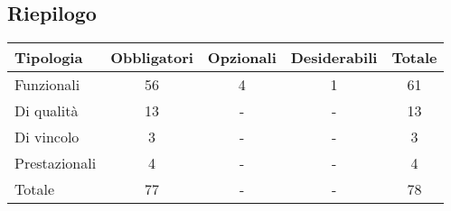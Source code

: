 \subsection{Riepilogo}
\begin{tabular}{|l|c|c|c|c|}
    \hline
    \textbf{Tipologia} & \textbf{Obbligatori} & \textbf{Opzionali} & \textbf{Desiderabili} & \textbf{Totale} \\
    \hline
    Funzionali & 56 & 4 & 1 & 61 \\
    \hline
    Di qualità & 13 & - & - & 13 \\
    \hline
    Di vincolo & 3 & - & - & 3 \\
    \hline
    Prestazionali & 4 & - & - & 4 \\
    \hline
    Totale & 77 & - & - & 78 \\
    \hline
\end{tabular}
